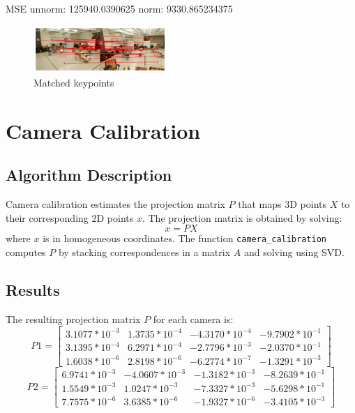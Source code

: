 {MSE unnorm: 125940.0390625 norm: 9330.865234375
\begin{figure}[h!]
	\centering
	\includegraphics[width=0.45\textwidth]{./student_response/results/lab-matches.png}
	\caption{Matched keypoints}
\end{figure}

\section{Camera Calibration}

\subsection{Algorithm Description}
Camera calibration estimates the projection matrix \( P \) that maps 3D points \( X \) to their corresponding 2D points \( x \). The projection matrix is obtained by solving:
\begin{equation}
	x = P X
\end{equation}
where \( x \) is in homogeneous coordinates. The function \texttt{camera\_calibration} computes \( P \) by stacking correspondences in a matrix \( A \) and solving using SVD.

\subsection{Results}
The resulting projection matrix \( P \) for each camera is:
\begin{equation}
	P1 = \begin{bmatrix} 3.1077 * 10^{-3} & 1.3735 * 10^{-4} & -4.3170 * 10^{-4} & -9.7902 * 10^{-1} \\
		3.1395 * 10^{-4} & 6.2971 * 10^{-4} & -2.7796 * 10^{-3} & -2.0370 * 10^{-1} \\
		1.6038 * 10^{-6} & 2.8198 * 10^{-6} & -6.2774 * 10^{-7} & -1.3291 * 10^{-3} 
	 \end{bmatrix}
\end{equation}
\begin{equation}
P2 = \begin{bmatrix}
	6.9741 * 10^{-3} & -4.0607 * 10^{-3} & -1.3182 * 10^{-3} & -8.2639 * 10^{-1} \\
	1.5549 * 10^{-3} & 1.0247 * 10^{-3} & -7.3327 * 10^{-3} & -5.6298 * 10^{-1} \\
	7.7575 * 10^{-6} & 3.6385 * 10^{-6} & -1.9327 * 10^{-6} & -3.4105 * 10^{-3} 
\end{bmatrix}
\end{equation}

}
